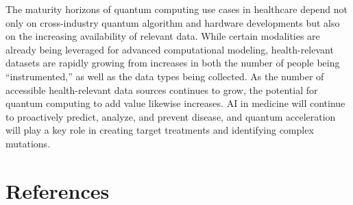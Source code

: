 \documentclass{scrartcl}
\begin{document}
The maturity horizons of quantum computing use cases in healthcare depend not only on cross-industry quantum algorithm and hardware developments but also on the increasing availability of relevant data. While certain modalities are already being leveraged for advanced computational modeling, health-relevant datasets are rapidly growing from increases in both the number of people being “instrumented,” as well as the data types being collected. As the number of accessible health-relevant data sources continues to grow, the potential for quantum computing to add value likewise increases. AI in medicine will continue to proactively predict, analyze, and prevent disease, and quantum acceleration will play a key role in creating target treatments and identifying complex mutations.

\section{References}
\label{sec:orgc361659}
\end{document}
